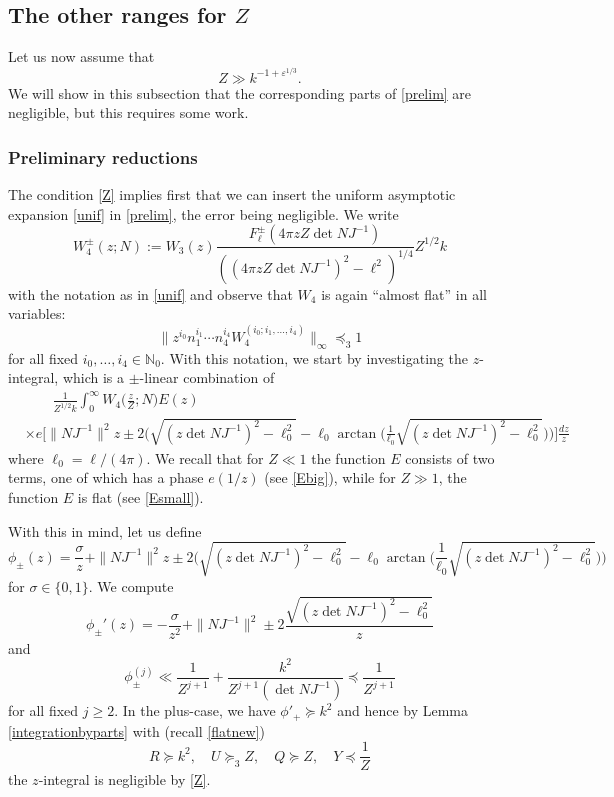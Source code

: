 \documentclass[11pt]{amsart}
\numberwithin{equation}{section}
\theoremstyle{plain}
\theoremstyle{definition}
\renewcommand{\geq}{\geqslant}
\numberwithin{equation}{section}
\begin{document}
\subsection{The other ranges for \texorpdfstring{$Z$}{Z}}

Let us now assume that
\begin{equation}\label{Z}
   Z \gg  k^{-1+\varepsilon^{1/3}}. 
   \end{equation} 
 We will show in this subsection that   the corresponding parts of \eqref{prelim} are negligible, but this requires some work. 
   
\subsubsection{Preliminary reductions} The condition \eqref{Z} implies first that we can insert the uniform asymptotic expansion \eqref{unif} in \eqref{prelim}, the error being negligible.  We write 
$$W^{\pm}_4(z; N) := W_3(z) \frac{F^{\pm}_{\ell}(4\pi zZ\det NJ^{-1})}{((4\pi zZ \det NJ^{-1})^2 - \ell^2)^{1/4}} Z^{1/2} k$$ with the notation as in \eqref{unif} and observe that $W_4$ is again ``almost flat'' in all variables: 
\begin{equation}\label{flatnew}
  \| z^{i_0} n_1^{i_1} \cdots n_4^{i_4} W_4^{(i_0; i_1, \ldots, i_4)} \|_{\infty} \preccurlyeq_{3} 1
  \end{equation}
for all fixed  $i_0, \ldots, i_4 \in \mathbb{N}_0$. With this notation, we start by investigating the $z$-integral, which is a $\pm$-linear combination of  
\begin{align}\label{zint}
&\quad\quad \frac{1}{Z^{1/2} k} \int_0^{\infty} W_4\Big(\frac{z}{Z}; N\Big) E(z) \\
 &\times e\Big[\| N J^{-1} \|^2z \pm 2 \Big(\sqrt{(z \det NJ^{-1})^2 - \ell_0^2}  -  \ell_0 \arctan\Big(\frac{1}{\ell_0}\sqrt{ (z\det NJ^{-1} )^2 - \ell_0^2}\Big) \Big) \Big]\frac{dz}{z}
 \end{align}
where $\ell_0 = \ell/(4\pi)$. We recall that for $Z \ll 1$ the function $E$ consists of two terms, one of which has a phase $e(1/z)$ (see \eqref{Ebig}), while for $Z \gg 1$, the function $E$ is flat (see \eqref{Esmall}).  

With this in mind, let us define
\[\phi_{\pm}(z) = \frac{\sigma}{z} + \| N J^{-1} \|^2z \pm 2 \Big(\sqrt{(z \det NJ^{-1})^2 - \ell_0^2}  -  \ell_0 \arctan\Big(\frac{1}{\ell_0}\sqrt{ (z\det NJ^{-1} )^2 - \ell_0^2}\Big) \Big)\]
for $\sigma \in \{0, 1\}$. We compute
\[ \phi_{\pm}'(z) = -\frac{\sigma}{z^2} + \| N J^{-1} \|^2 \pm  2 \frac{\sqrt{(z \det NJ^{-1})^2 - \ell_0^2} }{z} \]
and
\[  \phi^{(j)}_{\pm}  \ll \frac{1}{Z^{j+1}} + \frac{k^2}{Z^{j+1} (\det NJ^{-1})}\preccurlyeq \frac{1}{Z^{j+1}} \]
for all fixed  $j \geq 2$.  In the plus-case, we have $    \phi'_{+}  \succcurlyeq k^2$ %
and hence by Lemma \ref{integrationbyparts} with  (recall \eqref{flatnew})$$R \succcurlyeq k^2,  \quad U\succcurlyeq_{3} Z, \quad  Q \succcurlyeq Z, \quad Y \preccurlyeq \frac{1}{Z}$$
the $z$-integral is negligible by \eqref{Z}. %
\end{document}
